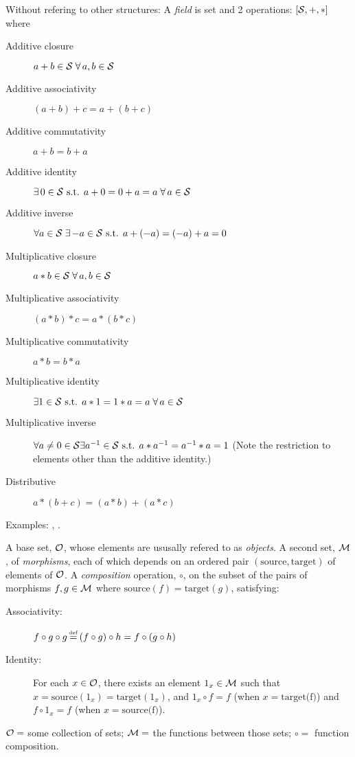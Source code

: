 Without refering to other structures:
A \textit{field} is set and 2 operations: 
$\left[ \mathcal{S}, +, * \right]$
where
\begin{description}
  \item[Additive closure] $a + b \in \mathcal{S} \; 
  \forall \, a,b \in \mathcal{S}$ 
  \item[Additive associativity] 
  $\left( a + b \right) + c = a + \left( b + c \right)$ 
  \item[Additive commutativity] $a + b = b + a$ 
  \item[Additive identity] $\exists \, 0 \in \mathcal{S} \text{ s.t. } 
  a + 0 = 0 + a = a \; \forall \, a \in \mathcal{S}$ 
  \item[Additive inverse] $\forall a \in \mathcal{S} \; 
  \exists \, {-a} \in \mathcal{S} 
  \text{ s.t. }  a + \left( -a \right) = \left( -a \right) + a = 0$ 
  \item[Multiplicative closure] $a * b \in \mathcal{S} \; \forall \,a,b \in \mathcal{S}$ 
  \item[Multiplicative associativity] 
  $\left( a * b \right) * c = a * \left( b * c \right)$ 
  \item[Multiplicative commutativity] $a * b = b * a$ 
  \item[Multiplicative identity] $\exists 1 \in \mathcal{S}
   \text{ s.t. } 
  a * 1 = 1 * a = a \; \forall \, a \in \mathcal{S}$ 
  \item[Multiplicative inverse] $\forall a \ne 0 \in \mathcal{S} 
  \exists a^{-1} \in \mathcal{S}
  \text{ s.t. }  a * a^{-1} = a^{-1} * a = 1$ 
  (Note the restriction to elements other than the additive identity.) 
  \item[Distributive] $a * \left( b + c \right) 
  = \left( a * b \right) + \left( a * c \right)$
\end{description}


Examples: 
, .


A base set, $\mathcal{O}$, 
whose elements are ususally refered to as \textit{objects}.
A second set, $\mathcal{M}$, of \textit{morphisms}, 
each of which depends on an ordered pair 
$\left( \text{source} , \text{target} \right)$ of elements of 
$\mathcal{O}$. 
A \textit{composition} operation, $\circ$, on 
the subset of the pairs of morphisms $f , g \in \mathcal{M}$
where $\text{source}(f) = \text{target}(g)$, satisfying:
\begin{description}
\item[Associativity:] $f \circ g \circ g \operatorname*{\overset{\underset{\mathrm{def}}{}}{=}} 
\left( f \circ g \right) \circ h 
= f \circ \left( g \circ h \right)$
\item[Identity:] For each $x \in \mathcal{O}$, there exists an element
$1_x \in \mathcal{M}$ such that 
$x = \text{source}(1_x) = \text{target}(1_x)$, and 
$1_x \circ f = f$ (when $x = \text{target(f)}$) and
$f \circ 1_x = f$ (when $x = \text{source(f)}$).
\end{description}

 \begin{example}
 $\mathcal{O} = $ some collection of sets;
 $\mathcal{M} = $ the functions between those sets;
 $\circ = $ function composition.  
 \end{example}
 